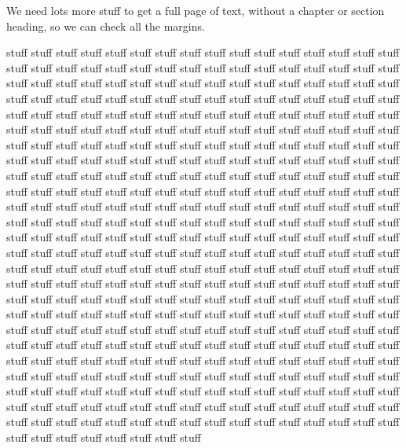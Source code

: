 \documentclass[
  dissertation]{bsu-cs}
\begin{document}
We need lots more stuff to get a full page of text, without a chapter or
section heading, so we can check all the margins.

stuff stuff stuff stuff stuff stuff stuff stuff stuff stuff stuff stuff
stuff stuff stuff stuff stuff stuff stuff stuff stuff stuff stuff stuff
stuff stuff stuff stuff stuff stuff stuff stuff stuff stuff stuff stuff
stuff stuff stuff stuff stuff stuff stuff stuff stuff stuff stuff stuff
stuff stuff stuff stuff stuff stuff stuff stuff stuff stuff stuff stuff
stuff stuff stuff stuff stuff stuff stuff stuff stuff stuff stuff stuff
stuff stuff stuff stuff stuff stuff stuff stuff stuff stuff stuff stuff
stuff stuff stuff stuff stuff stuff stuff stuff stuff stuff stuff stuff
stuff stuff stuff stuff stuff stuff stuff stuff stuff stuff stuff stuff
stuff stuff stuff stuff stuff stuff stuff stuff stuff stuff stuff stuff
stuff stuff stuff stuff stuff stuff stuff stuff stuff stuff stuff stuff
stuff stuff stuff stuff stuff stuff stuff stuff stuff stuff stuff stuff
stuff stuff stuff stuff stuff stuff stuff stuff stuff stuff stuff stuff
stuff stuff stuff stuff stuff stuff stuff stuff stuff stuff stuff stuff
stuff stuff stuff stuff stuff stuff stuff stuff stuff stuff stuff stuff
stuff stuff stuff stuff stuff stuff stuff stuff stuff stuff stuff stuff
stuff stuff stuff stuff stuff stuff stuff stuff stuff stuff stuff stuff
stuff stuff stuff stuff stuff stuff stuff stuff stuff stuff stuff stuff
stuff stuff stuff stuff stuff stuff stuff stuff stuff stuff stuff stuff
stuff stuff stuff stuff stuff stuff stuff stuff stuff stuff stuff stuff
stuff stuff stuff stuff stuff stuff stuff stuff stuff stuff stuff stuff
stuff stuff stuff stuff stuff stuff stuff stuff stuff stuff stuff stuff
stuff stuff stuff stuff stuff stuff stuff stuff stuff stuff stuff stuff
stuff stuff stuff stuff stuff stuff stuff stuff stuff stuff stuff stuff
stuff stuff stuff stuff stuff stuff stuff stuff stuff stuff stuff stuff
stuff stuff stuff stuff stuff stuff stuff stuff stuff stuff stuff stuff
stuff stuff stuff stuff stuff stuff stuff stuff stuff stuff stuff stuff
stuff stuff stuff stuff stuff stuff stuff stuff stuff stuff stuff stuff
stuff stuff stuff stuff stuff stuff stuff stuff stuff stuff stuff stuff
stuff stuff stuff stuff stuff stuff stuff stuff stuff stuff stuff stuff
stuff stuff stuff stuff stuff stuff stuff stuff stuff stuff stuff stuff
stuff stuff stuff stuff stuff stuff stuff stuff stuff stuff stuff stuff
stuff stuff stuff stuff stuff stuff stuff stuff stuff stuff stuff stuff
stuff stuff stuff stuff stuff stuff stuff stuff stuff stuff stuff stuff
\end{document}
